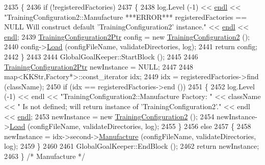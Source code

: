 \begin{DoxyCode}
2435 \{
2436   \textcolor{keywordflow}{if}  (!registeredFactories)
2437   \{
2438     log.Level (-1)  << \hyperlink{namespace_k_k_b_ad1f50f65af6adc8fa9e6f62d007818a8}{endl} << \textcolor{stringliteral}{"TrainingConfiguration2::Manufacture   ***ERROR***   registeredFactories
       == NULL Will construct default 'TrainingConfiguration2' instance."} << \hyperlink{namespace_k_k_b_ad1f50f65af6adc8fa9e6f62d007818a8}{endl} << 
      \hyperlink{namespace_k_k_b_ad1f50f65af6adc8fa9e6f62d007818a8}{endl};
2439     \hyperlink{class_k_k_m_l_l_1_1_training_configuration2}{TrainingConfiguration2Ptr}  config = \textcolor{keyword}{new} 
      \hyperlink{class_k_k_m_l_l_1_1_training_configuration2_a30f123ba51f4a4c91f8824fff105ebf3}{TrainingConfiguration2} ();
2440     config->\hyperlink{class_k_k_m_l_l_1_1_training_configuration2_a89bb53ad704979d78053e1ae8d1253c6}{Load} (configFileName, validateDirectories, log);
2441     \textcolor{keywordflow}{return}  config;
2442   \}
2443 
2444   GlobalGoalKeeper::StartBlock ();
2445 
2446   \hyperlink{class_k_k_m_l_l_1_1_training_configuration2}{TrainingConfiguration2Ptr}  newInstance = NULL;
2447 
2448   map<KKStr,Factory*>::const\_iterator  idx;
2449   idx = registeredFactories->find (className);
2450   \textcolor{keywordflow}{if}  (idx == registeredFactories->end ())
2451   \{
2452     log.Level (-1) << endl << \textcolor{stringliteral}{"TrainingConfiguration2::Manufacture   Factory: "} << className << \textcolor{stringliteral}{"  Is not
       defined;  will return instance of 'TrainingConfiguration2'."} << endl << \hyperlink{namespace_k_k_b_ad1f50f65af6adc8fa9e6f62d007818a8}{endl};
2453     newInstance = \textcolor{keyword}{new} \hyperlink{class_k_k_m_l_l_1_1_training_configuration2_a30f123ba51f4a4c91f8824fff105ebf3}{TrainingConfiguration2} ();
2454     newInstance->\hyperlink{class_k_k_m_l_l_1_1_training_configuration2_a89bb53ad704979d78053e1ae8d1253c6}{Load} (configFileName, validateDirectories, log);
2455   \}
2456   \textcolor{keywordflow}{else}
2457   \{
2458     newInstance = idx->second->\hyperlink{class_k_k_m_l_l_1_1_training_configuration2_aeedf4fa6f859b081f2657720ebc90b9f}{Manufacture} (configFileName, validateDirectories, log);
2459   \}
2460 
2461   GlobalGoalKeeper::EndBlock ();
2462   \textcolor{keywordflow}{return}  newInstance;
2463 \}  \textcolor{comment}{/* Manufacture */}
\end{DoxyCode}

